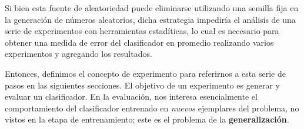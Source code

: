 Si bien esta fuente de aleatoriedad puede eliminarse utilizando una semilla fija en la generación de números aleatorios, dicha estrategia impediría el análisis de una serie de experimentos con herramientas estadíticas, lo cual es necesario para obtener una medida de error del clasificador en promedio realizando varios experimentos y agregando los resultados. 

Entonces, definimos el concepto de experimento para referirnos a esta serie de pasos en las siguientes secciones. El objetivo de un experimento es generar y evaluar un clasificador. En la evaluación, nos interesa esencialmente el comportamiento del clasificador entrenado en \textit{nuevos} ejemplares del problema, no vistos en la etapa de entrenamiento; este es el problema de la \textbf{generalización}.